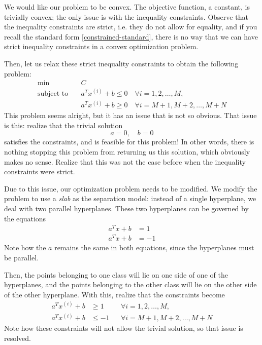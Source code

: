 \documentclass[a4paper]{article}
\theoremstyle{definition}
\begin{document}
We would like our problem to be convex.
The objective function, a constant, is trivially convex; the only issue is with the inequality constraints.
Observe that the inequality constraints are strict, i.e. they do not allow for equality, and if you recall the standard form \eqref{constrained-standard}, there is no way that we can have strict inequality constraints in a convex optimization problem.

Then, let us relax these strict inequality constraints to obtain the following problem:
\begin{align*}
	\min \quad & C \\
	\text{subject to} \quad & a^T x^{(i)} + b \leq 0 \quad \forall i = 1, 2, \dots, M, \\
	& a^T x^{(i)} + b \geq 0 \quad \forall i = M{+}1, M{+}2, \dots, M{+}N
\end{align*}
This problem seems alright, but it has an issue that is not so obvious.
That issue is this: realize that the trivial solution
\begin{equation*}
	a = 0, \quad b = 0
\end{equation*}
satisfies the constraints, and is feasible for this problem!
In other words, there is nothing stopping this problem from returning us this solution, which obviously makes no sense.
Realize that this was not the case before when the inequality constraints were strict.

Due to this issue, our optimization problem needs to be modified.
We modify the problem to use a \textit{slab} as the separation model: instead of a single hyperplane, we deal with two parallel hyperplanes.
These two hyperplanes can be governed by the equations
\begin{align*}
	a^T x + b & = 1 \\
	a^T x + b & = -1
\end{align*}
Note how the $a$ remains the same in both equations, since the hyperplanes must be parallel.

Then, the points belonging to one class will lie on one side of one of the hyperplanes, and the points belonging to the other class will lie on the other side of the other hyperplane.
With this, realize that the constraints become
\begin{align*}
	a^T x^{(i)} + b & \geq 1 && \forall i = 1, 2, \dots, M, \\
	a^T x^{(i)} + b & \leq -1 && \forall i = M{+}1, M{+}2, \dots, M{+}N
\end{align*}
Note how these constraints will not allow the trivial solution, so that issue is resolved.
\end{document}
